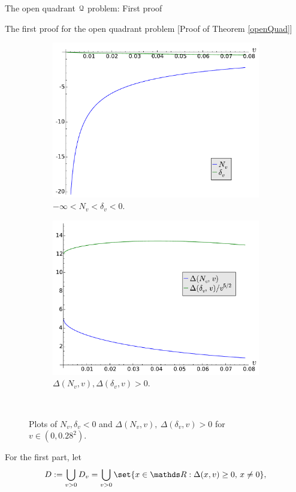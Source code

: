 \documentclass[11pt, a4paper, english, twoside, notitlepage, openright]{report}
\begin{document}
\begin{chapter}{The open quadrant $\mathcal{Q}$ problem: First proof}
\begin{section}{The first proof for the open quadrant problem} [Proof of Theorem \ref{openQuad}]
\begin{figure}[h]
\begin{subfigure}{.50\linewidth}
\includegraphics[width=1\textwidth]{plots/ch1_13_comp.pdf}
\caption{$-\infty<N_v<\delta_v<0$.\label{fig:comp}}
\end{subfigure}
\begin{subfigure}{.50\linewidth}\centering
\includegraphics[width=1\textwidth]{plots/ch1_14_positive.pdf}
\caption{$\Delta(N_{v},v),\Delta(\delta_{v},v)>0$.\label{fig:positive}}
\end{subfigure}\\[1ex]
\caption{Plots of $N_v,\delta_v<0$ and $\Delta(N_{v},v),\ \Delta(\delta_{v},v)>0$ for $v\in(0, 0.28^2)$.\label{fig:N_delta}}
\end{figure} For the first part, let 
$$
D:=\bigcup_{v>0}D_v=\bigcup_{v>0}\set{x\in\R:\Delta(x,v)\geq 0,\,x\neq 0},
$$
\end{section}
\end{chapter}
\end{document}
